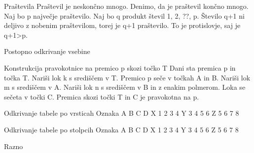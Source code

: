 
   Praštevila
      Praštevil je neskončno mnogo.
      Denimo, da je praštevil končno mnogo.
         Naj bo p največje praštevilo.
         Naj bo q produkt števil 1, 2, ??, p.
         Število q+1 ni deljivo z nobenim praštevilom, torej je q+1 praštevilo.
         To je protislovje, saj je q+1>p.


Postopno odkrivanje vsebine


   Konstrukcija pravokotnice na premico p skozi točko T
            Dani sta premica p in točka T.
            Nariši lok k s središčem v T.
            Premico p seče v točkah A in B.
            Nariši lok m s središčem v A.
            Nariši lok n s središčem v B in z enakim polmerom.
            Loka se sečeta v točki C.
            Premica skozi točki T in C je pravokotna na p.


   Odkrivanje tabele po vrsticah
      Oznaka A B C D
      X 1 2 3 4
      Y 3 4 5 6
      Z 5 6 7 8


   Odkrivanje tabele po stolpcih
      Oznaka A B C D
      X 1 2 3 4
      Y 3 4 5 6
      Z 5 6 7 8


Razno



